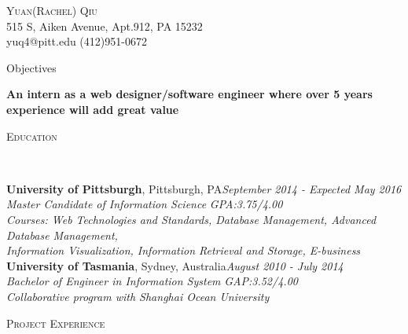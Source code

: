 \documentclass[3pt]{article}
\newenvironment{changemargin}[2]{%
  \begin{list}{}{%
    \setlength{\topsep}{0pt}%
    \setlength{\leftmargin}{#1}%
    \setlength{\rightmargin}{#2}%
    \setlength{\listparindent}{\parindent}%
    \setlength{\itemindent}{\parindent}%
    \setlength{\parsep}{\parskip}%
  }%
  \item[]}{\end{list}
}
\newcommand{\lineover}{
	\begin{changemargin}{-0.05in}{-0.05in}
		\vspace*{-8pt}
		\hrulefill \\
		\vspace*{-2pt}
	\end{changemargin}
}
\newcommand{\header}[1]{
	\begin{changemargin}{-0.5in}{-0.5in}
		{\Large \scshape{#1}}\\
  	\lineover
	\end{changemargin}
}
\newcommand{\contact}[4]{
	\begin{changemargin}{-0.5in}{-0.5in}
		\begin{center}
			{\Large \scshape {#1}}\\ \smallskip
			{#2}\\ \smallskip
			{#3}\\ \smallskip
			{#4}\smallskip
		\end{center}
	\end{changemargin}
}
\newenvironment{body} {
	\vspace*{-16pt}
	\begin{changemargin}{-0.25in}{-0.5in}
  }	
	{\end{changemargin}
}
\begin{document}
\contact{Yuan(Rachel) Qiu}{515 S, Aiken Avenue, Apt.912, PA 15232 }{yuq4@pitt.edu   (412)951-0672}



\header{Objectives}

\begin{body}
	\vspace{18pt}
	\textbf{An intern as a web designer/software engineer where over 5 years experience will add great value}\\
\end{body}

\medskip

\header{Education}

\begin{body}
	\vspace{18pt}
	\textbf{University of Pittsburgh}{}, Pittsburgh, PA\hfill \emph{September 2014 - Expected May 2016}{} \\
	\emph{Master Candidate of Information Science} \hfill \emph{GPA:3.75/4.00}\\
	\emph{Courses: Web Technologies and Standards, Database Management, Advanced Database Management, \\ \hspace{40pt}Information Visualization,  Information Retrieval and Storage, E-business}\\
  \medskip
	\textbf{University of Tasmania},  Sydney, Australia\hfill \emph{August 2010 - July 2014} \\
	\emph{Bachelor of Engineer in Information System} \hfill \emph{GAP:3.52/4.00}\\
	\emph{Collaborative program with Shanghai Ocean University}
\end{body}

\medskip

\header{Project Experience}
\end{document}
